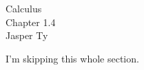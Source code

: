\documentclass{article}
\begin{document}
\begin{mytitle}
    Calculus \\
    Chapter 1.4 \\
    \normalsize Jasper Ty
\end{mytitle}

I'm skipping this whole section. 
\end{document}
